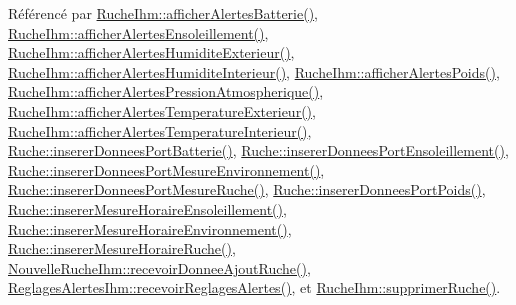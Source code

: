 Référencé par \hyperlink{class_ruche_ihm_a5181062e21dc73908b660d97e9621fb6}{Ruche\+Ihm\+::afficher\+Alertes\+Batterie()}, \hyperlink{class_ruche_ihm_aea5efc506f9825db2a4eb39a40d7eb18}{Ruche\+Ihm\+::afficher\+Alertes\+Ensoleillement()}, \hyperlink{class_ruche_ihm_a76b73e39e55443fc7b9bb773eac3321f}{Ruche\+Ihm\+::afficher\+Alertes\+Humidite\+Exterieur()}, \hyperlink{class_ruche_ihm_abfe91b271dde97048bb218b04c9e167b}{Ruche\+Ihm\+::afficher\+Alertes\+Humidite\+Interieur()}, \hyperlink{class_ruche_ihm_a641d05346e527c3386ed9df6a7e6fafc}{Ruche\+Ihm\+::afficher\+Alertes\+Poids()}, \hyperlink{class_ruche_ihm_abea08b19d4f52f6767a8618bbc25d956}{Ruche\+Ihm\+::afficher\+Alertes\+Pression\+Atmospherique()}, \hyperlink{class_ruche_ihm_ada4be5a54f7fa57de6190d44e3cfcb82}{Ruche\+Ihm\+::afficher\+Alertes\+Temperature\+Exterieur()}, \hyperlink{class_ruche_ihm_af4848134f2bc17d9772f2408a068e9d8}{Ruche\+Ihm\+::afficher\+Alertes\+Temperature\+Interieur()}, \hyperlink{class_ruche_a509367d6b2bcb7e6431fc1cc5ff606b5}{Ruche\+::inserer\+Donnees\+Port\+Batterie()}, \hyperlink{class_ruche_ad21de5f7d48195be0658f52c55f34183}{Ruche\+::inserer\+Donnees\+Port\+Ensoleillement()}, \hyperlink{class_ruche_a46c0f440f40a5125f2d579b481660457}{Ruche\+::inserer\+Donnees\+Port\+Mesure\+Environnement()}, \hyperlink{class_ruche_aa61f6dd8b15e5242ef3a3bdd87cca4a3}{Ruche\+::inserer\+Donnees\+Port\+Mesure\+Ruche()}, \hyperlink{class_ruche_a923f42fc4878a01f6102966a748e8f37}{Ruche\+::inserer\+Donnees\+Port\+Poids()}, \hyperlink{class_ruche_a658234b9d96541d204b95b74556742b6}{Ruche\+::inserer\+Mesure\+Horaire\+Ensoleillement()}, \hyperlink{class_ruche_ac52e79446c5629645e02e27d2a01e56c}{Ruche\+::inserer\+Mesure\+Horaire\+Environnement()}, \hyperlink{class_ruche_a3a093c088d9c97f347394c8a681f7302}{Ruche\+::inserer\+Mesure\+Horaire\+Ruche()}, \hyperlink{class_nouvelle_ruche_ihm_a268e781b033f2531ca5eab19cc828fdc}{Nouvelle\+Ruche\+Ihm\+::recevoir\+Donnee\+Ajout\+Ruche()}, \hyperlink{class_reglages_alertes_ihm_a5c40f718b28b948a90574ef0c2d3e587}{Reglages\+Alertes\+Ihm\+::recevoir\+Reglages\+Alertes()}, et \hyperlink{class_ruche_ihm_a85729b1ae4f3dfb5130eb45f5a426e3c}{Ruche\+Ihm\+::supprimer\+Ruche()}.


